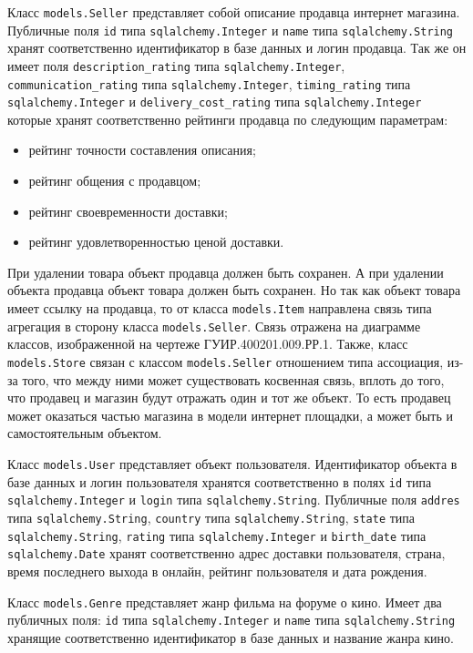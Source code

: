 Класс \texttt{models.Seller} представляет собой описание продавца интернет магазина. Публичные поля \texttt{id} типа \texttt{sqlalchemy.Integer} и \texttt{name} типа \texttt{sqlal\-chemy.String} хранят соответственно идентификатор в базе данных и логин продавца. Так же он имеет поля \texttt{description\_rating} типа \texttt{sqlalchemy.In\-teger}, \texttt{communication\_rating} типа \texttt{sqlalchemy.Integer}, \texttt{timing\_rating} типа \texttt{sqlalchemy.Integer} и \texttt{delivery\_cost\_rating} типа \texttt{sqlalchemy.Integer} которые хранят соответственно рейтинги продавца по следующим параметрам:
\begin{itemize}
\item рейтинг точности составления описания;
\item рейтинг общения с продавцом;
\item рейтинг своевременности доставки;
\item рейтинг удовлетворенностью ценой доставки.
\end{itemize}
При удалении товара объект продавца должен быть сохранен. А при удалении объекта продавца объект товара должен быть сохранен. Но так как объект товара имеет ссылку на продавца, то от класса \texttt{models.Item} направлена связь типа агрегация в сторону класса \texttt{models.Seller}. Связь отражена на диаграмме классов, изображенной на чертеже ГУИР.400201.009.РР.1. Также, класс \texttt{models.Store} связан с классом \texttt{models.Seller} отношением типа ассоциация, из-за того, что между ними может существовать косвенная связь, вплоть до того, что продавец и магазин будут отражать один и тот же объект. То есть продавец может оказаться частью магазина в модели интернет площадки, а может быть и самостоятельным объектом.

Класс \texttt{models.User} представляет объект пользователя. Идентификатор объекта в базе данных и логин пользователя хранятся соответственно в полях \texttt{id} типа \texttt{sqlalchemy.Integer} и \texttt{login} типа \texttt{sqlalchemy.String}. Публичные поля \texttt{addres} типа \texttt{sqlalchemy.String}, \texttt{country} типа \texttt{sqlalchemy.String}, \texttt{sta\-te} типа \texttt{sqlalchemy.String}, \texttt{rating} типа \texttt{sqlalchemy.Integer} и \texttt{birth\_date} типа \texttt{sqlalchemy.Date} хранят соответственно адрес доставки пользователя, страна, время последнего выхода в онлайн, рейтинг пользователя и дата рождения.

Класс \texttt{models.Genre} представляет жанр фильма на форуме о кино. Имеет два публичных поля: \texttt{id} типа \texttt{sqlalchemy.Integer} и \texttt{name} типа \texttt{sqlalche\-my.String} хранящие соответственно идентификатор в базе данных и название жанра кино.

